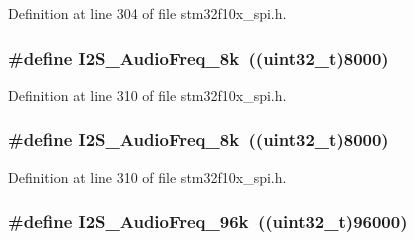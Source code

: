 Definition at line 304 of file stm32f10x\+\_\+spi.\+h.

\subsubsection[{\texorpdfstring{I2\+S\+\_\+\+Audio\+Freq\+\_\+8k}{I2S_AudioFreq_8k}}]{\setlength{\rightskip}{0pt plus 5cm}\#define I2\+S\+\_\+\+Audio\+Freq\+\_\+8k~(({\bf uint32\+\_\+t})8000)}\hypertarget{group___i2_s___audio___frequency_ga7868ac234485a80d45586dd87cd00043}{}\label{group___i2_s___audio___frequency_ga7868ac234485a80d45586dd87cd00043}


Definition at line 310 of file stm32f10x\+\_\+spi.\+h.

\subsubsection[{\texorpdfstring{I2\+S\+\_\+\+Audio\+Freq\+\_\+8k}{I2S_AudioFreq_8k}}]{\setlength{\rightskip}{0pt plus 5cm}\#define I2\+S\+\_\+\+Audio\+Freq\+\_\+8k~(({\bf uint32\+\_\+t})8000)}\hypertarget{group___i2_s___audio___frequency_ga7868ac234485a80d45586dd87cd00043}{}\label{group___i2_s___audio___frequency_ga7868ac234485a80d45586dd87cd00043}


Definition at line 310 of file stm32f10x\+\_\+spi.\+h.

\subsubsection[{\texorpdfstring{I2\+S\+\_\+\+Audio\+Freq\+\_\+96k}{I2S_AudioFreq_96k}}]{\setlength{\rightskip}{0pt plus 5cm}\#define I2\+S\+\_\+\+Audio\+Freq\+\_\+96k~(({\bf uint32\+\_\+t})96000)}\hypertarget{group___i2_s___audio___frequency_ga5acd02a974e90bb8f2c4e07f8fa0231b}{}\label{group___i2_s___audio___frequency_ga5acd02a974e90bb8f2c4e07f8fa0231b}


